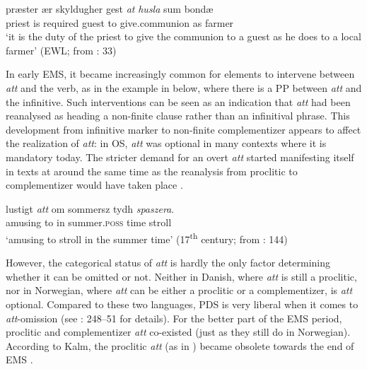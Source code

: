 \documentclass[output=paper]{langscibook}
\begin{document}
\ea \label{ex:intro:10}
\gll præster   ær   skyldugher  gest \textit{at} \textit{husla} sum  bondæ \\
  priest  is  required    guest   to  give.communion  as  farmer  \\
\glt ‘it is the duty of the priest to give the communion to a guest as he does to a local farmer’ (EWL; from \citealt{Falk2010Språkhistoria}: 33)
\z


In early EMS, it became increasingly common for elements to intervene between \textit{att} and the verb, as in the example in  below, where there is a PP between \textit{att} and the infinitive. Such interventions can be seen as an indication that \textit{att} had been reanalysed as heading a non-finite clause rather than an infinitival phrase. This development from infinitive marker to non-finite complementizer appears to affect the realization of \textit{att}: in OS, \textit{att} was optional in many contexts where it is mandatory today. The stricter demand for an overt \textit{att} started manifesting itself in texts at around the same time as the reanalysis from proclitic to complementizer would have taken place \citep[35]{Falk2010Studier}.


\ea \label{ex:intro:11}
\gll  lustigt \textit{att} om     sommersz     tydh \textit{spaszera}. \\
  amusing  to   in   summer.\textsc{poss}  time  stroll\\
\glt ‘amusing to stroll in the summer time’ (17\textsuperscript{th} century; from \citealt{Kalm2016Satsekvivalenta}: 144)
\z


However, the categorical status of \textit{att} is hardly the only factor determining whether it can be omitted or not. Neither in Danish, where \textit{att} is still a proclitic, nor in Norwegian, where \textit{att} can be either a proclitic or a complementizer, is \textit{att} optional. Compared to these two languages, PDS is very liberal when it comes to \textit{att}{}-omission (see \citealt{Faarlund2019}: 248–51 for details). For the better part of the EMS period, proclitic and complementizer \textit{att} co-existed (just as they still do in Norwegian). According to Kalm, the proclitic \textit{att} (as in ) became obsolete towards the end of EMS \citep[145]{Kalm2016Satsekvivalenta}.
\end{document}
